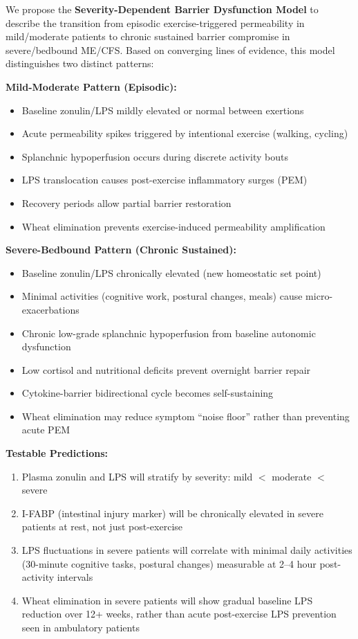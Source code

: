 \begin{speculation}
\label{spec:chronic-episodic-barrier}
We propose the \textbf{Severity-Dependent Barrier Dysfunction Model} to describe the transition from episodic exercise-triggered permeability in mild/moderate patients to chronic sustained barrier compromise in severe/bedbound ME/CFS. Based on converging lines of evidence, this model distinguishes two distinct patterns:

\textbf{Mild-Moderate Pattern (Episodic):}
\begin{itemize}
    \item Baseline zonulin/LPS mildly elevated or normal between exertions
    \item Acute permeability spikes triggered by intentional exercise (walking, cycling)
    \item Splanchnic hypoperfusion occurs during discrete activity bouts
    \item LPS translocation causes post-exercise inflammatory surges (PEM)
    \item Recovery periods allow partial barrier restoration
    \item Wheat elimination prevents exercise-induced permeability amplification
\end{itemize}

\textbf{Severe-Bedbound Pattern (Chronic Sustained):}
\begin{itemize}
    \item Baseline zonulin/LPS chronically elevated (new homeostatic set point)
    \item Minimal activities (cognitive work, postural changes, meals) cause micro-exacerbations
    \item Chronic low-grade splanchnic hypoperfusion from baseline autonomic dysfunction
    \item Low cortisol and nutritional deficits prevent overnight barrier repair
    \item Cytokine-barrier bidirectional cycle becomes self-sustaining
    \item Wheat elimination may reduce symptom ``noise floor'' rather than preventing acute PEM
\end{itemize}

\textbf{Testable Predictions:}
\begin{enumerate}
    \item Plasma zonulin and LPS will stratify by severity: mild $<$ moderate $<$ severe
    \item I-FABP (intestinal injury marker) will be chronically elevated in severe patients at rest, not just post-exercise
    \item LPS fluctuations in severe patients will correlate with minimal daily activities (30-minute cognitive tasks, postural changes) measurable at 2--4 hour post-activity intervals
    \item Wheat elimination in severe patients will show gradual baseline LPS reduction over 12+ weeks, rather than acute post-exercise LPS prevention seen in ambulatory patients
\end{enumerate}


\end{speculation}
